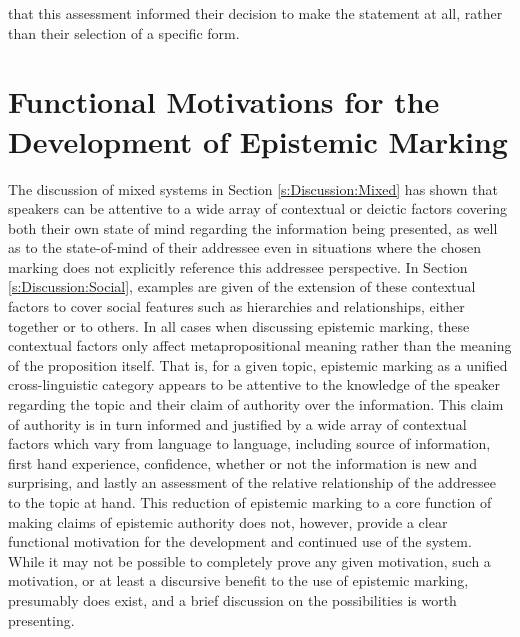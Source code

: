 that this assessment informed their decision to make the statement at all, rather than their selection of a specific form.

\section{Functional Motivations for the Development of Epistemic Marking}\label{s:Discussion:Motivations}
The discussion of mixed systems in Section \ref{s:Discussion:Mixed} has shown that speakers can be attentive to a wide array of contextual or deictic factors covering both their own state of mind regarding the information being presented, as well as to the state-of-mind of their addressee even in situations where the chosen marking does not explicitly reference this addressee perspective. In Section \ref{s:Discussion:Social}, examples are given of the extension of these contextual factors to cover social features such as hierarchies and relationships, either together or to others. In all cases when discussing epistemic marking, these contextual factors only affect metapropositional meaning rather than the meaning of the proposition itself. That is, for a given topic, epistemic marking as a unified cross-linguistic category appears to be attentive to the knowledge of the speaker regarding the topic and their claim of authority over the information. This claim of authority is in turn informed and justified by a wide array of contextual factors which vary from language to language, including source of information, first hand experience, confidence, whether or not the information is new and surprising, and lastly an assessment of the relative relationship of the addressee to the topic at hand. This reduction of epistemic marking to a core function of making claims of epistemic authority does not, however, provide a clear functional motivation for the development and continued use of the system. While it may not be possible to completely prove any given motivation, such a motivation, or at least a discursive benefit to the use of epistemic marking, presumably does exist, and a brief discussion on the possibilities is worth presenting. 

